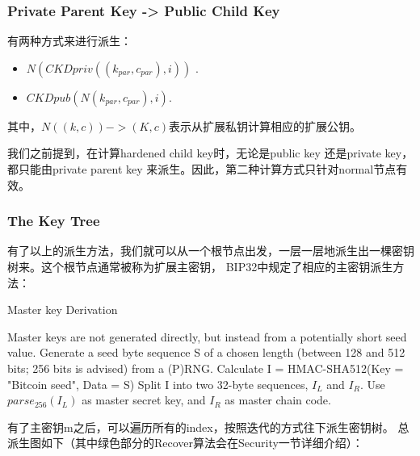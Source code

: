 \subsubsection{Private Parent Key -> Public Child Key}
有两种方式来进行派生：
\begin{itemize}
\item $N(CKDpriv((k_{par}, c_{par}), i))$ .  
\item $CKDpub(N(k_{par}, c_{par}), i)$. 
\end{itemize}
其中，$N((k, c)) -> (K, c)$表示从扩展私钥计算相应的扩展公钥。

我们之前提到，在计算hardened child key时，无论是public key 还是private key，都只能由private parent key 来派生。因此，第二种计算方式只针对normal节点有效。


\subsubsection{The Key Tree}
有了以上的派生方法，我们就可以从一个根节点出发，一层一层地派生出一棵密钥树来。这个根节点通常被称为扩展主密钥，
BIP32中规定了相应的主密钥派生方法：

\begin{algorithm}[tbp]\footnotesize
\caption{Master key Derivation}
  	\begin{algorithmic}[1]
	    \STATE Master keys are not generated directly, but instead from a potentially 
	    short seed value.
		\STATE Generate a seed byte sequence S of a chosen length (between 128 and 512 bits; 
		256 bits is advised) from a (P)RNG.
		\STATE Calculate I = HMAC-SHA512(Key = "Bitcoin seed", Data = S)
		\STATE Split I into two 32-byte sequences, $I_L$ and $I_R$.
		\STATE Use $parse_{256}(I_L)$ as master secret key, and $I_R$ as master chain code.
    \end{algorithmic}
\end{algorithm}

有了主密钥m之后，可以遍历所有的index，按照迭代的方式往下派生密钥树。
总派生图如下（其中绿色部分的Recover算法会在Security一节详细介绍）：


